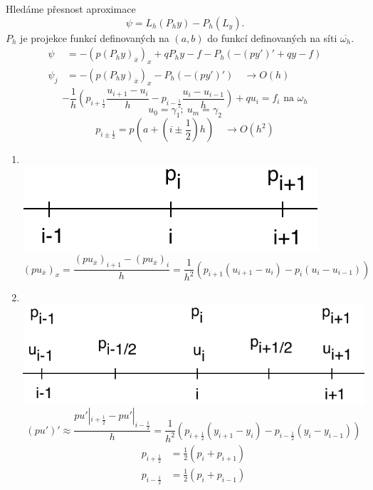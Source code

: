 	Hledáme přesnost aproximace
	$$ \psi = L_h(P_h y ) - P_h(L_y).$$
	$P_h$ je projekce funkcí definovaných na $(a, b)$ do funkcí definovaných na síti $\overline{\omega_h}$.
	\begin{align*}
		\psi &= -(p(P_h y)_{\overline{x}})_x + qP_hy - f - P_h(-(py')' + qy - f) \\
		\psi_j &= -(p(P_h y)_{\overline{x}})_x - P_h(-(py')') \quad \rightarrow O(h)
	\end{align*}
	$$ - \frac{1}{h} \left( p_{i + \frac{1}{2}} \frac{u_{i+1} - u_i}{h} - p_{i - \frac{1}{2}}
	\frac{u_i - u_{i-1}}{h} \right)  + qu_i = f_i \text{ na } \omega_h$$
	$$ u_0 = \gamma_1;\ u_m = \gamma_2 $$
	$$ p_{i \pm \frac{1}{2}} = p\left(a + \left(i \pm \frac{1}{2}\right)h \right) \quad
	\rightarrow O(h^2)$$
	\begin{enumerate}
		\item ~\\ \includegraphics{mexson1.pdf}
			$$ (pu_{\overline{x}})_x = \frac{(pu_{\overline{x}})_{i+1} - (pu_{\overline{x}})_i}
			{h} = \frac{1}{h^2} (p_{i+1}(u_{i+1} - u_i) - p_i(u_i - u_{i-1})) $$
		\item ~\\ \includegraphics{mexson2.pdf}
			$$ (pu')' \approx \frac{pu'|_{i + \frac{1}{2}} - pu'|_{i - \frac{1}{2}}}{h} =
			\frac{1}{h^2}(p_{i + \frac{1}{2}}(y_{i+1} - y_i) - p_{i - \frac{1}{2}}(y_i - y_{i-1}))$$
			\begin{align*}
				p_{i + \frac{1}{2}} &= \frac{1}{2}(p_i + p_{i+1}) \\
				p_{i - \frac{1}{2}} &= \frac{1}{2}(p_i + p_{i-1})
			\end{align*}
	\end{enumerate}
	


